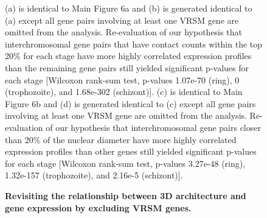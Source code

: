 \begin{figure}
  \begin{center}
  \hspace{0.05\textwidth}
  \hspace{0.05\textwidth}
  \hspace{0.05\textwidth}
   \end{center}
\caption{{\bf Revisiting the relationship between 3D architecture and gene expression by excluding VRSM genes. }}
{   (a) is identical to Main Figure 6a and (b) is generated identical to (a) except all gene pairs
    involving at least one VRSM gene are omitted from the analysis. Re-evaluation of our
    hypothesis that interchromosomal gene pairs that have contact counts within the top 20\%
    for each stage have more highly correlated expression profiles than the remaining gene pairs
    still yielded significant p-values for each stage [Wilcoxon rank-sum test, p-values 1.07e-70 (ring),
    0 (trophozoite), and 1.68e-302 (schizont)].
    (c) is identical to Main Figure 6b and (d) is generated identical to (c) except all gene pairs
    involving at least one VRSM gene are omitted from the analysis. Re-evaluation of our
    hypothesis that interchromosomal gene pairs closer than 20\% of the nuclear diameter have more
    highly correlated expression profiles than other genes still yielded
    significant p-values for each stage [Wilcoxon rank-sum test, p-values 3.27e-48 (ring),
    1.32e-157 (trophozoite), and 2.16e-5 (schizont)].
}
\label{suppfig:expVSdistWithoutVRSM}
\end{figure}
\clearpage

